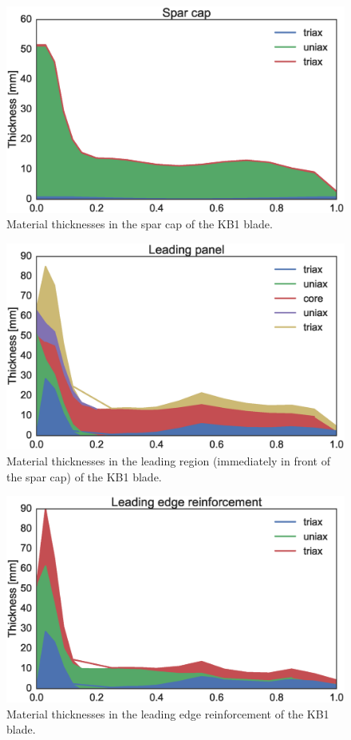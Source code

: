 \begin{figure}[!ht]
\begin{center}
	\includegraphics[width=.85\linewidth]{figures/KB1_region04.eps}
\end{center}
\caption{Material thicknesses in the spar cap of the KB1 blade.}
\label{fig:KB1matstackr04}
\end{figure}

\begin{figure}[!ht]
\begin{center}
	\includegraphics[width=.85\linewidth]{figures/KB1_region06.eps}
\end{center}
\caption{Material thicknesses in the leading region (immediately in front of the spar cap) of the KB1 blade.}
\label{fig:KB1matstackr06}
\end{figure}

\begin{figure}[!ht]
\begin{center}
	\includegraphics[width=.85\linewidth]{figures/KB1_region07.eps}
\end{center}
\caption{Material thicknesses in the leading edge reinforcement of the KB1 blade.}
\label{fig:KB1matstackr07}
\end{figure}

